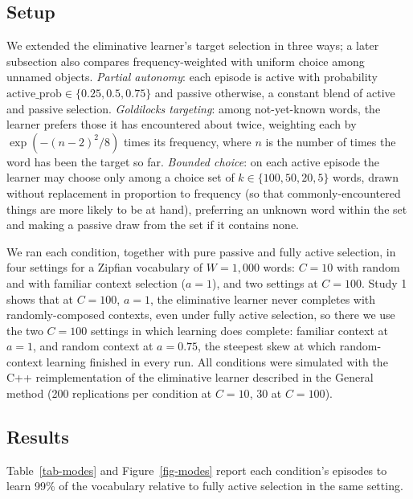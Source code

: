 \documentclass[a4paper,natbib,man]{apa6}
\begin{document}
\subsection{Setup}
We extended the eliminative learner's target selection in three ways; a later subsection also compares frequency-weighted with uniform choice among unnamed objects. \textit{Partial autonomy}: each episode is active with probability $\text{active\_prob} \in \{0.25, 0.5, 0.75\}$ and passive otherwise, a constant blend of active and passive selection. \textit{Goldilocks targeting}: among not-yet-known words, the learner prefers those it has encountered about twice, weighting each by $\exp(-(n-2)^2/8)$ times its frequency, where $n$ is the number of times the word has been the target so far. \textit{Bounded choice}: on each active episode the learner may choose only among a choice set of $k \in \{100, 50, 20, 5\}$ words, drawn without replacement in proportion to frequency (so that commonly-encountered things are more likely to be at hand), preferring an unknown word within the set and making a passive draw from the set if it contains none.

We ran each condition, together with pure passive and fully active selection, in four settings for a Zipfian vocabulary of $W=1{,}000$ words: $C=10$ with random and with familiar context selection ($a=1$), and two settings at $C=100$. Study 1 shows that at $C=100$, $a=1$, the eliminative learner never completes with randomly-composed contexts, even under fully active selection, so there we use the two $C=100$ settings in which learning does complete: familiar context at $a=1$, and random context at $a=0.75$, the steepest skew at which random-context learning finished in every run. All conditions were simulated with the C++ reimplementation of the eliminative learner described in the General method (200 replications per condition at $C=10$, 30 at $C=100$).

\subsection{Results}
Table~\ref{tab-modes} and Figure~\ref{fig-modes} report each condition's episodes to learn 99\% of the vocabulary relative to fully active selection in the same setting.
\end{document}
